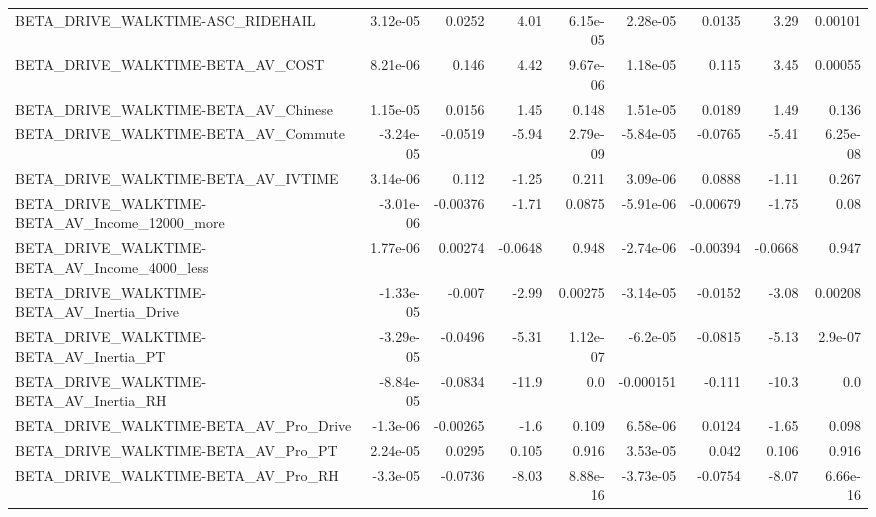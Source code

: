 \begin{tabular}{lrrrrrrrr}
BETA\_DRIVE\_WALKTIME-ASC\_RIDEHAIL                   &    3.12e-05 &       0.0252 &     4.01 & 6.15e-05 &   2.28e-05 &      0.0135 &         3.29 &       0.00101 \\
BETA\_DRIVE\_WALKTIME-BETA\_AV\_COST                   &    8.21e-06 &        0.146 &     4.42 & 9.67e-06 &   1.18e-05 &       0.115 &         3.45 &       0.00055 \\
BETA\_DRIVE\_WALKTIME-BETA\_AV\_Chinese                &    1.15e-05 &       0.0156 &     1.45 &    0.148 &   1.51e-05 &      0.0189 &         1.49 &         0.136 \\
BETA\_DRIVE\_WALKTIME-BETA\_AV\_Commute                &   -3.24e-05 &      -0.0519 &    -5.94 & 2.79e-09 &  -5.84e-05 &     -0.0765 &        -5.41 &      6.25e-08 \\
BETA\_DRIVE\_WALKTIME-BETA\_AV\_IVTIME                 &    3.14e-06 &        0.112 &    -1.25 &    0.211 &   3.09e-06 &      0.0888 &        -1.11 &         0.267 \\
BETA\_DRIVE\_WALKTIME-BETA\_AV\_Income\_12000\_more      &   -3.01e-06 &     -0.00376 &    -1.71 &   0.0875 &  -5.91e-06 &    -0.00679 &        -1.75 &          0.08 \\
BETA\_DRIVE\_WALKTIME-BETA\_AV\_Income\_4000\_less       &    1.77e-06 &      0.00274 &  -0.0648 &    0.948 &  -2.74e-06 &    -0.00394 &      -0.0668 &         0.947 \\
BETA\_DRIVE\_WALKTIME-BETA\_AV\_Inertia\_Drive          &   -1.33e-05 &       -0.007 &    -2.99 &  0.00275 &  -3.14e-05 &     -0.0152 &        -3.08 &       0.00208 \\
BETA\_DRIVE\_WALKTIME-BETA\_AV\_Inertia\_PT             &   -3.29e-05 &      -0.0496 &    -5.31 & 1.12e-07 &   -6.2e-05 &     -0.0815 &        -5.13 &       2.9e-07 \\
BETA\_DRIVE\_WALKTIME-BETA\_AV\_Inertia\_RH             &   -8.84e-05 &      -0.0834 &    -11.9 &      0.0 &  -0.000151 &      -0.111 &        -10.3 &           0.0 \\
BETA\_DRIVE\_WALKTIME-BETA\_AV\_Pro\_Drive              &    -1.3e-06 &     -0.00265 &     -1.6 &    0.109 &   6.58e-06 &      0.0124 &        -1.65 &         0.098 \\
BETA\_DRIVE\_WALKTIME-BETA\_AV\_Pro\_PT                 &    2.24e-05 &       0.0295 &    0.105 &    0.916 &   3.53e-05 &       0.042 &        0.106 &         0.916 \\
BETA\_DRIVE\_WALKTIME-BETA\_AV\_Pro\_RH                 &    -3.3e-05 &      -0.0736 &    -8.03 & 8.88e-16 &  -3.73e-05 &     -0.0754 &        -8.07 &      6.66e-16 \\

\end{tabular}

